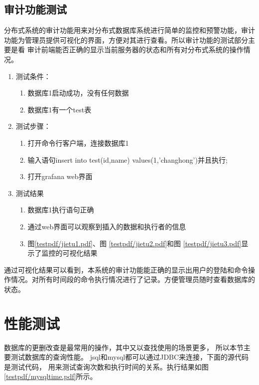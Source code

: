 \subsection{审计功能测试}
分布式系统的审计功能用来对分布式数据库系统进行简单的监控和预警功能，审计功能为管理员提供可视化的界面，方便对其进行查看。所以审计功能的测试部分主要是看
审计前端能否正确的显示当前服务器的状态和所有对分布式系统的操作情况。
\begin{enumerate}
	\item 测试条件：
	\begin{enumerate}
		\item 数据库1启动成功，没有任何数据
		\item 数据库1有一个test表
	\end{enumerate}
	\item 测试步骤：
	\begin{enumerate}
		\item 打开命令行客户端，连接数据库1
		\item 输入语句insert into test(id,name) values(1,'changhong')并且执行;
		\item 打开grafana web界面
	\end{enumerate}
	\item 	测试结果
	\begin{enumerate}
		\item 数据库1执行语句正确
		\item 通过web界面可以观察到插入的数据和执行者的信息
		\item 图\ref{testpdf/jietu1.pdf}、图
		\ref{testpdf/jietu2.pdf}和图
		\ref{testpdf/jietu3.pdf}显示了监控的可视化结果
	\end{enumerate}
\end{enumerate}	

 
 通过可视化结果可以看到，本系统的审计功能能正确的显示出用户的登陆和命令操作情况。对所有时间段的命令执行情况进行了记录。方便管理员随时查看数据库的状态。
\section{性能测试}
数据库的更删改查是最常用的操作，其中又以查找使用的场景更多，
所以本节主要测试数据库的查询性能。
jsql和mysql都可以通过JDBC来连接，下面的源代码是测试代码，
用来测试查询次数和执行时间的关系。执行结果如图\ref{testpdf/mysqltime.pdf}所示。


